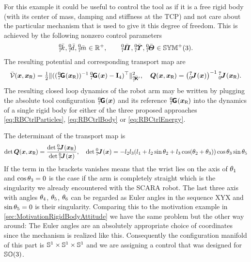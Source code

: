 For this example it could be useful to control the tool as if it is a free rigid body (with its center of mass, damping and stiffness at the TCP) and not care about the particular mechanism that is used to give it this degree of freedom.
This is achieved by the following nonzero control parameters
\begin{align}
 \bodyStiffnessC{0}{7}, \bodyDampingC{0}{7}, \bodyMassC{0}{7} \in \RealNumP,
\qquad
 \bodyMOSC{0}{7}, \bodyMODC{0}{7}, \bodyMOIC{0}{7} \in \SymMatP(3).
\end{align}
The resulting potential and corresponding transport map are
\begin{align}
 \potentialEnergyC(\sysCoord, \sysCoordR) = \tfrac{1}{2} \norm[\bodyStiffMatCp{0}{7}]{ ((\bodyHomoCoord{0}{7}(\sysCoordR))^{-1}\, \bodyHomoCoord{0}{7}(\sysCoord) - \idMat[4] )^\top}^2,
\quad
 \sysTransportMap(\sysCoord,\sysCoordR) = \big( \bodyJac{7}{0}(\sysCoord) \big)^{-1} \, \bodyJac{7}{0}(\sysCoordR).
\end{align}
The resulting closed loop dynamics of the robot arm may be written by plugging the absolute tool configuration $\bodyHomoCoord{0}{7}(\sysCoord)$ and its reference $\bodyHomoCoord{0}{7}(\sysCoordR)$ into the dynamics of a single rigid body for either of the three proposed approaches \eqref{eq:RBCtrlParticles}, \eqref{eq:RBCtrlBody} or \eqref{eq:RBCtrlEnergy}.

The determinant of the transport map is
\begin{align}
 \det \sysTransportMap(\sysCoord,\sysCoordR) = \frac{\det \bodyJac{0}{7}(\sysCoordR)}{\det \bodyJac{0}{7}(\sysCoord)},
\quad
 \det \bodyJac{0}{7}(\sysCoord) = -l_2 l_3 (l_1 + l_2 \sin\jointAngle[2] + l_3 \cos(\jointAngle[2]+\jointAngle[3])) \cos\jointAngle[3] \sin\jointAngle[5]
\end{align}
If the term in the brackets vanishes means that the wrist lies on the axis of $\jointAngle[1]$ and $\cos\jointAngle[3] = 0$ is the case if the arm is completely straight which is the singularity we already encountered with the SCARA robot.
The last three axis with angles $\jointAngle[4]$, $\jointAngle[5]$, $\jointAngle[6]$ can be regarded as Euler angles in the sequence XYX and $\sin\jointAngle[5] = 0$ is their singularity.
Comparing this to the motivation example in \autoref{sec:MotivationRigidBodyAttitude} we have the same problem but the other way around:
The Euler angles are an absolutely appropriate choice of coordinates since the mechanism is realized like this.
Consequently the configuration manifold of this part is $\Sphere^1 \times \Sphere^1 \times \Sphere^1$ and we are assigning a control that was designed for $\SpecialOrthogonalGroup(3)$.

